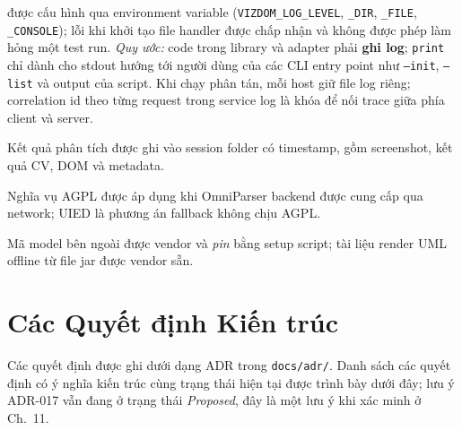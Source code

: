 \documentclass[11pt,a4paper]{report}
\newcommand{\code}[1]{\texttt{#1}}
\begin{document}
\begin{description}[leftmargin=0pt,style=nextline]
    được cấu hình qua environment variable (\code{VIZDOM\_LOG\_LEVEL},
    \code{\_DIR}, \code{\_FILE}, \code{\_CONSOLE}); lỗi khi khởi tạo file handler
    được chấp nhận và không được phép làm hỏng một test run. \emph{Quy ước:} code trong
    library và adapter phải \textbf{ghi log}; \code{print} chỉ dành cho stdout hướng
    tới người dùng của các CLI entry point như \code{--init}, \code{--list} và output
    của script. Khi chạy phân tán, mỗi host giữ file log riêng; correlation id theo từng
    request trong service log là khóa để nối trace giữa phía client và server.
  \item[Lưu trữ] Kết quả phân tích được ghi vào session folder có timestamp, gồm
    screenshot, kết quả CV, DOM và metadata.
  \item[Giấy phép] Nghĩa vụ AGPL được áp dụng khi OmniParser backend được cung cấp qua
    network; UIED là phương án fallback không chịu AGPL.
  \item[Hoạt động offline] Mã model bên ngoài được vendor và \emph{pin} bằng setup
    script; tài liệu render UML offline từ file jar được vendor sẵn.
\end{description}

\chapter{Các Quyết định Kiến trúc}
Các quyết định được ghi dưới dạng ADR trong \code{docs/adr/}. Danh sách các quyết định
có ý nghĩa kiến trúc cùng trạng thái hiện tại được trình bày dưới đây; lưu ý ADR-017 vẫn
đang ở trạng thái \emph{Proposed}, đây là một lưu ý khi xác minh ở Ch.~11.
\end{document}
